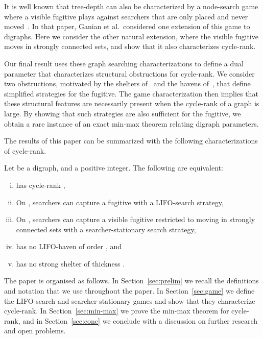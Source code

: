 \documentclass{llncs}
\begin{document}
It is well known that tree-depth can also be characterized by a node-search game where a visible fugitive plays against searchers that are only placed and never moved~\cite{GHKLOR09}.  In that paper, Ganian et al.~considered one extension of this game to digraphs.  Here we consider the other natural extension, where the visible fugitive moves in strongly connected sets, and show that it also characterizes cycle-rank.

Our final result uses these graph searching characterizations to define a dual parameter that characterizes structural obstructions for cycle-rank.  We consider two obstructions, motivated by the shelters of~\cite{GT11} and the havens of~\cite{JRST01}, that define simplified strategies for the fugitive. The game characterization then implies that these structural features are necessarily present when the cycle-rank of a graph is large.  By showing that such strategies are also sufficient for the fugitive, we obtain a rare instance of an exact min-max theorem relating digraph parameters.

The results of this paper can be summarized with the following characterizations of cycle-rank.
\begin{mainthm}\label{thm:main2}
Let  be a digraph, and  a positive integer.  The following are equivalent:
\begin{enumerate}[(i) ]
\item  has cycle-rank ,
\item On ,  searchers can capture a fugitive with a LIFO-search strategy,
\item On ,  searchers can capture a visible fugitive restricted to moving in strongly connected sets with a searcher-stationary search strategy,
\item  has no LIFO-haven of order , and
\item  has no strong shelter of thickness .
\end{enumerate}
\end{mainthm}

The paper is organised as follows.  In Section~\ref{sec:prelim} we recall the definitions and notation that we use throughout the paper.  In Section~\ref{sec:game} we define the LIFO-search and searcher-stationary games and show that they characterize cycle-rank.  In Section~\ref{sec:min-max} we prove the min-max theorem for cycle-rank, and in Section~\ref{sec:conc} we conclude with a discussion on further research and open problems.
\end{document}
